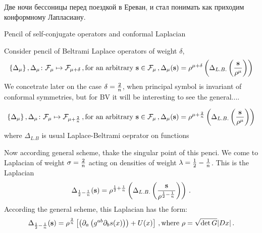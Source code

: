 Две ночи бессоницы перед поездкой в Ереван, и стал
понимать как приходим конформному Лапласиану.


\centerline {Pencil of self-conjugate operators and
     conformal Laplacian}
 





\baselineskip=14pt
\def\vare {\varepsilon}
\def\A {{\bf A}}
\def\t {\tilde}
\def\bs {{\bf s}}
\def\a {\alpha}
\def\d {\delta}
\def\K {{\bf K}}
\def\N {{\bf N}}
\def\w {\omega}
\def\s {{\sigma}}
\def\S {{\Sigma}}
\def\s {{\sigma}}
\def\p{\partial}
\def\vare{{\varepsilon}}
\def\Q {{\bf Q}}
\def\D {{\cal D}}
\def\G {{\Gamma}}
\def\C {{\bf C}}
\def\L {{\cal L}}
\def\F {{\cal F}}
\def\Z {{\bf Z}}
\def\U  {{\cal U}}
\def\H {{\bf H}}
\def\R  {{\bf R}}
\def\S  {{\bf S}}
\def\E  {{\bf E}}
\def\l {\lambda}
\def\degree {{\bf {\rm degree}\,\,}}
\def \finish {${\,\,\vrule height1mm depth2mm width 8pt}$}
\def \m {\medskip}
\def\p {\partial}
\def\r {{\bf r}}
\def\pt {{\bf pt}}
\def\v {{\bf v}}
\def\n {{\bf n}}
\def\t {{\bf t}}
\def\b {{\bf b}}
\def\c {{\bf c }}
\def\e{{\bf e}}
\def\ac {{\bf a}}
\def \X   {{\bf X}}
\def \Y   {{\bf Y}}
\def \x   {{\bf x}}
\def \y   {{\bf y}}
\def\ss  {\sigma_{\rm sph}}
\def\grad {{\rm grad\,}}


  Consider pencil of Beltrami Laplace operators
       of weight $\d$,
                $$
\{\Delta_\mu\}\,, 
   \Delta_\mu\colon \F_{\mu}\mapsto \F_{\mu+\d}\,,
\hbox{for an arbitrary $\bs\in \F_\mu$}\,, 
\Delta_\mu(\bs)=\rho^{\mu+\d}
\left(\Delta_{L.B.}\left({\bf 
\bs\over \rho^\mu}\right)\right)
               $$
We concetrate later  on the case $\d={2\over n}$,
when principal symbol is invariant of conformal symmetries,
but for BV it will be interesting to see the general....             
   


           $$
\{\Delta_\mu\}\,, 
   \Delta_\mu\colon \F_{\mu}\mapsto \F_{\mu+{2\over n}}\,,
\hbox{for an arbitrary $\bs\in \F_\mu$}\,, 
\Delta_\mu(\bs)=\rho^{\mu+{2\over n}}
\left(\Delta_{L.B.}\left({\bf \bs\over \rho^\mu}\right)\right)
               $$
where  $\Delta_{L.B}$ is usual Laplace-Beltrami oeprator on functions

Now according general scheme, thake the singular point
of this penci. 
  We come to Laplacian
of weight $\sigma={2\over n}$
acting on densities of weight
  $\l={1\over 2}-{1\over n}$.
This is the Laplacian
          $$
\Delta_{{1\over 2}-{1\over n}}(\bs)=
    \rho^{{1\over 2}+{1\over n}}
           \left(
   \Delta_{L.B.}
    \left(
    {\bs\over \rho^{{1\over 2}-{1\over n}}}
     \right)\right)\,.
               $$
According the general scheme, this Laplacian has the form:
                 $$
\Delta_{{1\over 2}-{1\over n}}(\bs)=
  \rho^{2\over n}\left[
  \left(\p_a\left(g^{ab}\p_b s(x)\right)\right)
           +U(x)\right]\,,
{\rm where}\,\,\rho=\sqrt{\det G}|Dx|\,.
                 $$
               
